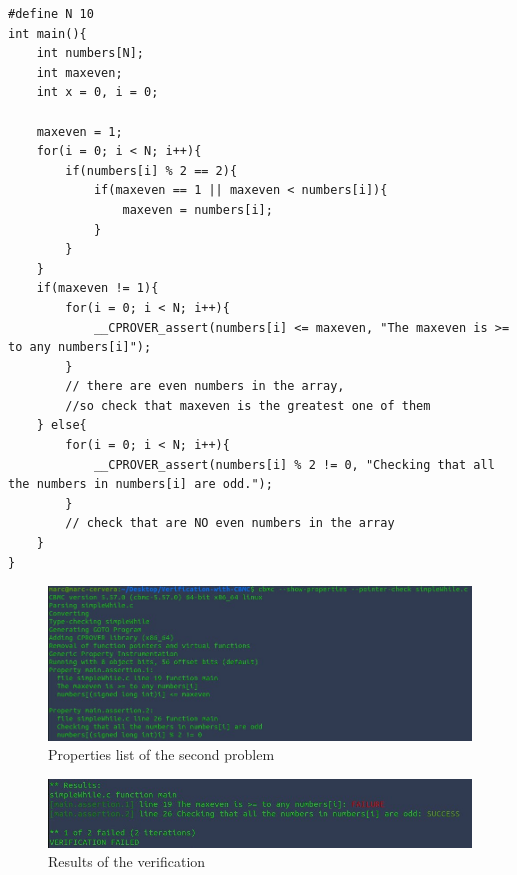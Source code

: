 \documentclass[a4paper,12pt]{article}
\begin{document}
\newpage

\begin{lstlisting}
#define N 10
int main(){
    int numbers[N];
    int maxeven;
    int x = 0, i = 0;
    
    maxeven = 1;
    for(i = 0; i < N; i++){
        if(numbers[i] % 2 == 2){
            if(maxeven == 1 || maxeven < numbers[i]){
                maxeven = numbers[i];
            }
        }
    }
    if(maxeven != 1){
        for(i = 0; i < N; i++){
            __CPROVER_assert(numbers[i] <= maxeven, "The maxeven is >= to any numbers[i]");
        }
        // there are even numbers in the array,
        //so check that maxeven is the greatest one of them
    } else{
        for(i = 0; i < N; i++){
            __CPROVER_assert(numbers[i] % 2 != 0, "Checking that all the numbers in numbers[i] are odd.");
        }
        // check that are NO even numbers in the array
    }
}
\end{lstlisting}


\begin{figure}[H]
    \centering
    \includegraphics[scale = 0.7]{images/exercise2.jpg}
    \caption{Properties list of the second problem}
    \label{fig:propList2}
\end{figure}


\begin{figure}[H]
    \centering
    \includegraphics[scale = 0.8]{images/fail2.jpg}
    \caption{Results of the verification}
    \label{fig:failedVerification}
\end{figure}
\end{document}
